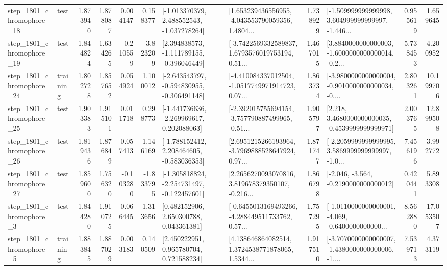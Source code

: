 \begin{tabular}{llrrrrllrlrr}
 step\_1801\_chromophore\_18 &      test &      1.873940 &    1.878087 &      0.004147 &  0.158377 &   [-1.013370379, 2.488552543, -1.037278264] &  [1.653239436556955, -4.043553790059356, 1.4804... &       1.738929 &  [-1.509999999999998, 3.604999999999997, -1.446... &            0.955619 &          1.659645 \\
 step\_1801\_chromophore\_19 &      test &      1.844824 &    1.634265 &     -0.210559 & -3.823209 &   [2.394838573, -1.111789155, -0.396046449] &  [-3.7422569332589837, 1.6793576019753194, 0.51... &       1.467015 &  [3.8840000000000003, -1.6000000000000014, -0.2... &            5.738453 &          4.200952 \\
 step\_1801\_chromophore\_24 &  training &      1.802728 &    1.857652 &      0.054924 &  1.100012 &  [-2.643543797, -0.594830955, -0.306491148] &  [-4.410084337012504, -1.0517749971914723, 0.07... &       1.863734 &  [-3.9800000000000004, -0.9010000000000034, -0.... &            2.803261 &         10.199706 \\
 step\_1801\_chromophore\_25 &      test &      1.903383 &    1.915101 &      0.011718 &  0.298773 &   [-1.441736636, -2.269969617, 0.202088063] &  [-2.392015755694154, -3.757790887499965, -0.51... &       1.905797 &   [2.218, 3.4680000000000035, -0.4539999999999971] &            2.003765 &         12.899508 \\
 step\_1801\_chromophore\_26 &      test &      1.819436 &    1.876849 &      0.057413 &  1.146169 &   [-1.788152412, 2.208464605, -0.583036353] &  [2.6951215266193964, -3.7969888528647924, 0.97... &       1.871747 &  [-2.2059999999999995, 3.5869999999999997, -1.0... &            7.456196 &          3.992772 \\
 step\_1801\_chromophore\_27 &      test &      1.859600 &    1.756320 &     -0.103280 & -1.833795 &  [-1.305818824, -2.254731497, -0.122457601] &  [2.2656270093070816, 3.819678379350107, -0.216... &       1.866798 &              [-2.046, -3.564, -0.2190000000000012] &            0.420441 &          5.893308 \\
  step\_1801\_chromophore\_3 &      test &      1.844280 &    1.910725 &      0.066445 &  1.313656 &     [0.482152906, 2.650300788, 0.043361381] &  [-0.6455013169493266, -4.288449511733762, 0.57... &       1.757295 &  [-1.0110000000000001, -4.069, -0.6400000000000... &            8.562880 &         17.053507 \\
  step\_1801\_chromophore\_5 &  training &      1.883845 &    1.887029 &      0.003183 &  0.140509 &     [2.450222951, 0.965780704, 0.721588234] &  [4.138646864082514, 1.3724538771878065, 1.5344... &       1.917510 &  [-3.7070000000000007, -1.4380000000000006, -1.... &            7.539713 &          4.373119 \\

\end{tabular}
